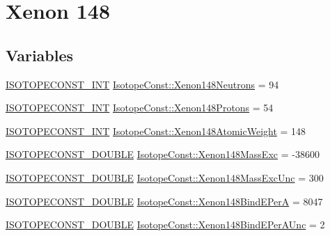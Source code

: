 \hypertarget{group___isotope_const-_xenon-_xe148}{}\section{Xenon 148}
\label{group___isotope_const-_xenon-_xe148}
\subsection*{Variables}
\begin{DoxyCompactItemize}
\item 
\mbox{\hyperlink{group___isotope_const-_macros_ga5f18360b3e99483a35c32d789e62621c}{I\+S\+O\+T\+O\+P\+E\+C\+O\+N\+S\+T\+\_\+\+I\+NT}} \mbox{\hyperlink{group___isotope_const-_xenon-_xe148_ga42bc3475fc14a5917648695441d64391}{Isotope\+Const\+::\+Xenon148\+Neutrons}} = 94
\item 
\mbox{\hyperlink{group___isotope_const-_macros_ga5f18360b3e99483a35c32d789e62621c}{I\+S\+O\+T\+O\+P\+E\+C\+O\+N\+S\+T\+\_\+\+I\+NT}} \mbox{\hyperlink{group___isotope_const-_xenon-_xe148_gada36f54c30eeaf634fae117cc7d56327}{Isotope\+Const\+::\+Xenon148\+Protons}} = 54
\item 
\mbox{\hyperlink{group___isotope_const-_macros_ga5f18360b3e99483a35c32d789e62621c}{I\+S\+O\+T\+O\+P\+E\+C\+O\+N\+S\+T\+\_\+\+I\+NT}} \mbox{\hyperlink{group___isotope_const-_xenon-_xe148_ga98837a609ded2ca75b393d8c63d91ac8}{Isotope\+Const\+::\+Xenon148\+Atomic\+Weight}} = 148
\item 
\mbox{\hyperlink{group___isotope_const-_macros_ga8f45a7272ce02c0b4c65c44636ed719a}{I\+S\+O\+T\+O\+P\+E\+C\+O\+N\+S\+T\+\_\+\+D\+O\+U\+B\+LE}} \mbox{\hyperlink{group___isotope_const-_xenon-_xe148_ga53cfc8ae410673b4b4111c4837dca2fa}{Isotope\+Const\+::\+Xenon148\+Mass\+Exc}} = -\/38600
\item 
\mbox{\hyperlink{group___isotope_const-_macros_ga8f45a7272ce02c0b4c65c44636ed719a}{I\+S\+O\+T\+O\+P\+E\+C\+O\+N\+S\+T\+\_\+\+D\+O\+U\+B\+LE}} \mbox{\hyperlink{group___isotope_const-_xenon-_xe148_ga62507bc4946bdc926a1ab178cdca52ec}{Isotope\+Const\+::\+Xenon148\+Mass\+Exc\+Unc}} = 300
\item 
\mbox{\hyperlink{group___isotope_const-_macros_ga8f45a7272ce02c0b4c65c44636ed719a}{I\+S\+O\+T\+O\+P\+E\+C\+O\+N\+S\+T\+\_\+\+D\+O\+U\+B\+LE}} \mbox{\hyperlink{group___isotope_const-_xenon-_xe148_ga83f8c34497f902e62b0b2aeb1aeffdfd}{Isotope\+Const\+::\+Xenon148\+Bind\+E\+PerA}} = 8047
\item 
\mbox{\hyperlink{group___isotope_const-_macros_ga8f45a7272ce02c0b4c65c44636ed719a}{I\+S\+O\+T\+O\+P\+E\+C\+O\+N\+S\+T\+\_\+\+D\+O\+U\+B\+LE}} \mbox{\hyperlink{group___isotope_const-_xenon-_xe148_gaace8892c3eda3fe3cee30a78f1037eda}{Isotope\+Const\+::\+Xenon148\+Bind\+E\+Per\+A\+Unc}} = 2

\end{DoxyCompactItemize}
